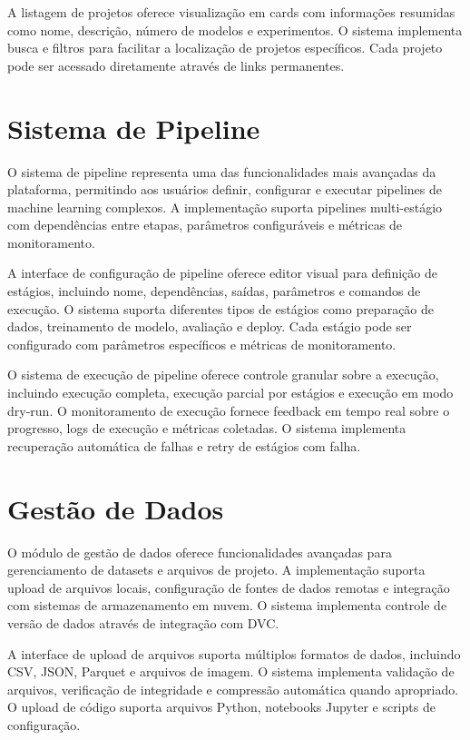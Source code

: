 \documentclass[12pt,a4paper]{article}
\begin{document}
A listagem de projetos oferece visualização em cards com informações resumidas como nome, descrição, número de modelos e experimentos. O sistema implementa busca e filtros para facilitar a localização de projetos específicos. Cada projeto pode ser acessado diretamente através de links permanentes.

\section{Sistema de Pipeline}

O sistema de pipeline representa uma das funcionalidades mais avançadas da plataforma, permitindo aos usuários definir, configurar e executar pipelines de machine learning complexos. A implementação suporta pipelines multi-estágio com dependências entre etapas, parâmetros configuráveis e métricas de monitoramento.

A interface de configuração de pipeline oferece editor visual para definição de estágios, incluindo nome, dependências, saídas, parâmetros e comandos de execução. O sistema suporta diferentes tipos de estágios como preparação de dados, treinamento de modelo, avaliação e deploy. Cada estágio pode ser configurado com parâmetros específicos e métricas de monitoramento.

O sistema de execução de pipeline oferece controle granular sobre a execução, incluindo execução completa, execução parcial por estágios e execução em modo dry-run. O monitoramento de execução fornece feedback em tempo real sobre o progresso, logs de execução e métricas coletadas. O sistema implementa recuperação automática de falhas e retry de estágios com falha.

\section{Gestão de Dados}

O módulo de gestão de dados oferece funcionalidades avançadas para gerenciamento de datasets e arquivos de projeto. A implementação suporta upload de arquivos locais, configuração de fontes de dados remotas e integração com sistemas de armazenamento em nuvem. O sistema implementa controle de versão de dados através de integração com DVC.

A interface de upload de arquivos suporta múltiplos formatos de dados, incluindo CSV, JSON, Parquet e arquivos de imagem. O sistema implementa validação de arquivos, verificação de integridade e compressão automática quando apropriado. O upload de código suporta arquivos Python, notebooks Jupyter e scripts de configuração.
\end{document}

